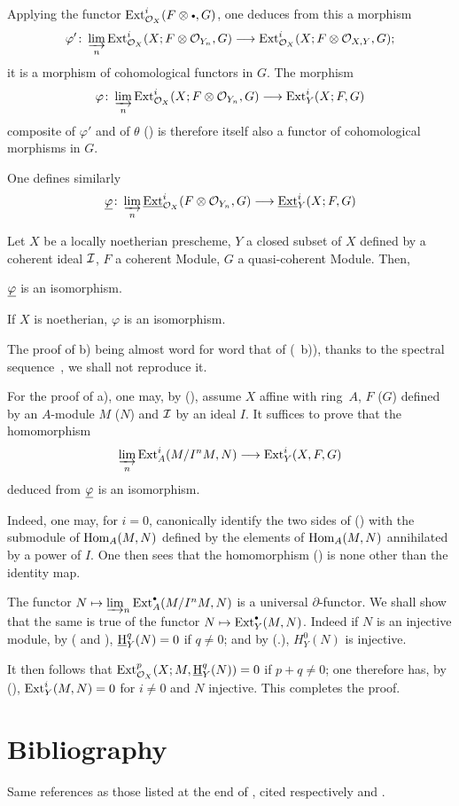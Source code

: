 Applying the functor $\Ext_{\OX}^i(F\otimes\boule, G)$, one deduces from this a morphism
\[
\varphi'\colon \varinjlim_{n} \Ext_{\OX}^i(X;F\otimes \Oo_{Y_n}, G) \to \Ext_{\OX}^i(X;F \otimes \Oo_{X, Y}, G);
\]
it is a morphism of cohomological functors in $G$. The morphism
\[
\varphi\colon \varinjlim_{n} \Ext_{\OX}^i(X;F\otimes \Oo_{Y_n}, G) \to \Ext_Y^i(X;F, G)
\]
composite of $\varphi'$ and of $\theta$ (\cf {}) is therefore itself also a functor of cohomological morphisms in $G$.

One defines similarly
\[
\Sheafphi\colon \varinjlim_n \SheafExt_{\OX}^i(F \otimes \Oo_{Y_n}, G) \to \SheafExt_Y^i(X;F, G)
\]

\begin{theorem} \label{VI.2.3}
Let $X$ be a locally noetherian prescheme, $Y$ a closed subset of $X$ defined by a coherent ideal $\mathcal{I}$, $F$ a coherent Module, $G$ a quasi-coherent Module. Then,
\begin{enumeratea}
\item
$\underline{\varphi}$ is an isomorphism.
\item
If $X$ is noetherian, $\varphi$ is an isomorphism.
\end{enumeratea}
\end{theorem}

The proof of b) being almost word for word that of (~b)), thanks to the spectral sequence~, we shall not reproduce it.

For the proof of a), one may, by (), assume $X$ affine with ring~$A$, $F$ (\resp $G$) defined by an $A$-module $M$ (\resp $N$) and $\mathcal{I}$ by an ideal $I$. It suffices to prove that the homomorphism
\begin{equation} \label{VI.2.3.1} \varinjlim_{{n}} \Ext_A^i(M/I^nM, N) \to \Ext_Y^i(X, F, G)
\end{equation}
deduced from $\underline{\varphi}$ is an isomorphism.

Indeed, one may, for $i=0$, canonically identify the two sides of () with the submodule of $\operatorname{Hom}_A(M, N)$ defined by the elements of $\operatorname{Hom}_A(M, N)$ annihilated by a power of $I$. One then sees that the homomorphism () is none other than the identity map.

The functor $N\mto \varinjlim_{n} \Ext_A^\boule(M/I^nM, N)$ is a universal $\partial$-functor. We shall show that the same is true of the functor $N \mto \Ext_Y^\boule(M, N)$. Indeed if $N$ is an injective module, by ( and ), $\operatorname{\underline{H}}_Y^q(N)=0$ if $q \neq 0$; and by (.), $H_Y^{0}(N)$ is injective.

It then follows that $\operatorname{Ext}_{\mathcal{O}_X}^p(X;M, \operatorname{\underline{H}}_Y^q(N))=0$ if $p+q \neq 0$; one therefore has, by (), $\operatorname{Ext}_Y^i(M, N)=0$ for $i\neq 0$ and $N$ injective. This completes the proof.

\section*{Bibliography} Same references as those listed at the end of \Exp {}, cited respectively \cite{Tohoku} and \cite{Godement}.
